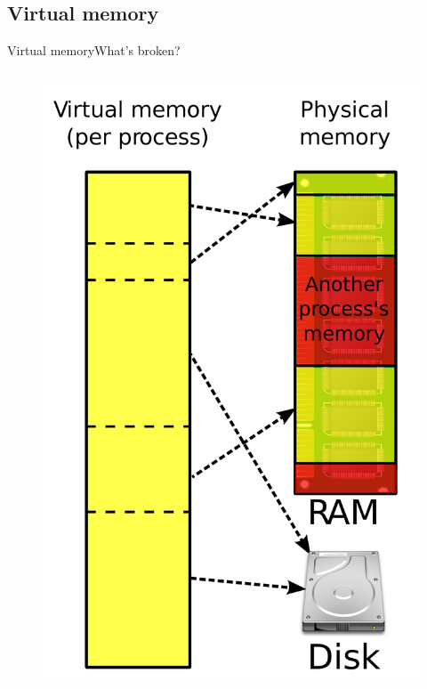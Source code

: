 \documentclass[10pt]{beamer}
\begin{document}
\subsection{Virtual memory}
\begin{frame}{Virtual memory}{What's broken?}
  \begin{columns}[T]
    \begin{column}{.2\textwidth}
      \begin{figure}[ht]
        \centering
        \includegraphics[width=1\textwidth, keepaspectratio=true]{images/vm.png}
      \end{figure}
    \end{column}


\end{columns}
\end{frame}
\end{document}
